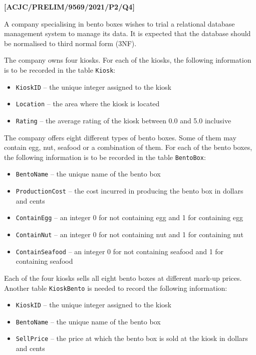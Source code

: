 \item \textbf{{[}ACJC/PRELIM/9569/2021/P2/Q4{]} }

\noindent A company specialising in bento boxes wishes to trial a
relational database management system to manage its data. It is expected
that the database should be normalised to third normal form (3NF).

\noindent The company owns four kiosks. For each of the kiosks, the
following information is to be recorded in the table \texttt{Kiosk}: 
\begin{itemize}
\item \texttt{KioskID} -- the unique integer assigned to the kiosk 
\item \texttt{Location} -- the area where the kiosk is located 
\item \texttt{Rating} -- the average rating of the kiosk between 0.0 and
5.0 inclusive
\end{itemize}
\noindent The company offers eight different types of bento boxes.
Some of them may contain egg, nut, seafood or a combination of them.
For each of the bento boxes, the following information is to be recorded
in the table \texttt{BentoBox}:
\begin{itemize}
\item \texttt{BentoName} -- the unique name of the bento box 
\item \texttt{ProductionCost} -- the cost incurred in producing the bento
box in dollars and cents 
\item \texttt{ContainEgg} -- an integer 0 for not containing egg and 1
for containing egg 
\item \texttt{ContainNut} -- an integer 0 for not containing nut and 1
for containing nut 
\item \texttt{ContainSeafood} -- an integer 0 for not containing seafood
and 1 for containing seafood 
\end{itemize}
\noindent Each of the four kiosks sells all eight bento boxes at different
mark-up prices. Another table \texttt{KioskBento} is needed to record
the following information:
\begin{itemize}
\item \texttt{KioskID} -- the unique integer assigned to the kiosk 
\item \texttt{BentoName} -- the unique name of the bento box 
\item \texttt{SellPrice} -- the price at which the bento box is sold at
the kiosk in dollars and cents
\end{itemize}

